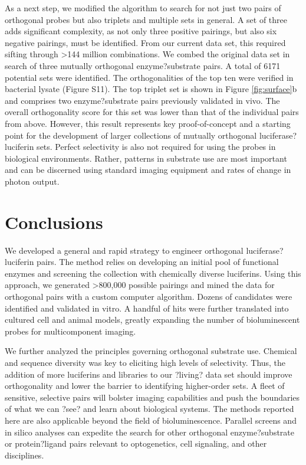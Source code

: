 As a next step, we modified the algorithm to search for not just two pairs of orthogonal probes but also triplets and multiple sets in general. A set of three adds significant complexity, as not only three positive pairings, but also six negative pairings, must be identified. From our current data set, this required sifting through >144 million combinations. We combed the original data set in search of three mutually orthogonal enzyme?substrate pairs. A total of 6171 potential sets were identified. The orthogonalities of the top ten were verified in bacterial lysate (Figure S11). The top triplet set is shown in Figure \ref{fig:surface}b and comprises two enzyme?substrate pairs previously validated in vivo. The overall orthogonality score for this set was lower than that of the individual pairs from above. However, this result represents key proof-of-concept and a starting point for the development of larger collections of mutually orthogonal luciferase?luciferin sets. Perfect selectivity is also not required for using the probes in biological environments. Rather, patterns in substrate use are most important and can be discerned using standard imaging equipment and rates of change in photon output.

\section{Conclusions}
We developed a general and rapid strategy to engineer orthogonal luciferase?luciferin pairs. The method relies on developing an initial pool of functional enzymes and screening the collection with chemically diverse luciferins. Using this approach, we generated >800,000 possible pairings and mined the data for orthogonal pairs with a custom computer algorithm. Dozens of candidates were identified and validated in vitro. A handful of hits were further translated into cultured cell and animal models, greatly expanding the number of bioluminescent probes for multicomponent imaging.
\par
We further analyzed the principles governing orthogonal substrate use. Chemical and sequence diversity was key to eliciting high levels of selectivity. Thus, the addition of more luciferins and libraries to our ?living? data set should improve orthogonality and lower the barrier to identifying higher-order sets. A fleet of sensitive, selective pairs will bolster imaging capabilities and push the boundaries of what we can ?see? and learn about biological systems. The methods reported here are also applicable beyond the field of bioluminescence. Parallel screens and in silico analyses can expedite the search for other orthogonal enzyme?substrate or protein?ligand pairs relevant to optogenetics, cell signaling, and other disciplines.




